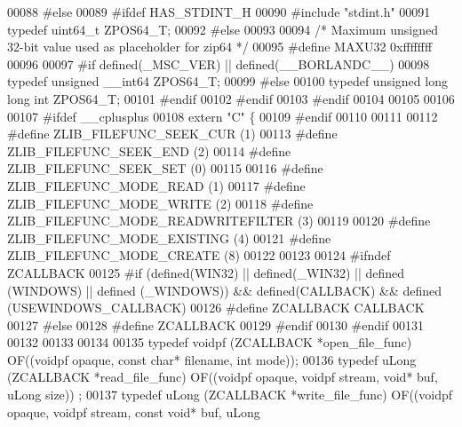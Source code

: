 \begin{DoxyCode}
00088 \textcolor{preprocessor}{#else}
00089 \textcolor{preprocessor}{#ifdef HAS\_STDINT\_H}
00090 \textcolor{preprocessor}{#include "stdint.h"}
00091 \textcolor{keyword}{typedef} uint64\_t ZPOS64\_T;
00092 \textcolor{preprocessor}{#else}
00093 
00094 \textcolor{comment}{/* Maximum unsigned 32-bit value used as placeholder for zip64 */}
00095 \textcolor{preprocessor}{#define MAXU32 0xffffffff}
00096 
00097 \textcolor{preprocessor}{#if defined(\_MSC\_VER) || defined(\_\_BORLANDC\_\_)}
00098 \textcolor{keyword}{typedef} \textcolor{keywordtype}{unsigned} \_\_int64 ZPOS64\_T;
00099 \textcolor{preprocessor}{#else}
00100 \textcolor{keyword}{typedef} \textcolor{keywordtype}{unsigned} \textcolor{keywordtype}{long} \textcolor{keywordtype}{long} \textcolor{keywordtype}{int} ZPOS64\_T;
00101 \textcolor{preprocessor}{#endif}
00102 \textcolor{preprocessor}{#endif}
00103 \textcolor{preprocessor}{#endif}
00104 
00105 
00106 
00107 \textcolor{preprocessor}{#ifdef \_\_cplusplus}
00108 \textcolor{keyword}{extern} \textcolor{stringliteral}{"C"} \{
00109 \textcolor{preprocessor}{#endif}
00110 
00111 
00112 \textcolor{preprocessor}{#define ZLIB\_FILEFUNC\_SEEK\_CUR (1)}
00113 \textcolor{preprocessor}{#define ZLIB\_FILEFUNC\_SEEK\_END (2)}
00114 \textcolor{preprocessor}{#define ZLIB\_FILEFUNC\_SEEK\_SET (0)}
00115 
00116 \textcolor{preprocessor}{#define ZLIB\_FILEFUNC\_MODE\_READ      (1)}
00117 \textcolor{preprocessor}{#define ZLIB\_FILEFUNC\_MODE\_WRITE     (2)}
00118 \textcolor{preprocessor}{#define ZLIB\_FILEFUNC\_MODE\_READWRITEFILTER (3)}
00119 
00120 \textcolor{preprocessor}{#define ZLIB\_FILEFUNC\_MODE\_EXISTING (4)}
00121 \textcolor{preprocessor}{#define ZLIB\_FILEFUNC\_MODE\_CREATE   (8)}
00122 
00123 
00124 \textcolor{preprocessor}{#ifndef ZCALLBACK}
00125 \textcolor{preprocessor}{ #if (defined(WIN32) || defined(\_WIN32) || defined (WINDOWS) || defined (\_WINDOWS)) && defined(CALLBACK) &&
       defined (USEWINDOWS\_CALLBACK)}
00126 \textcolor{preprocessor}{   #define ZCALLBACK CALLBACK}
00127 \textcolor{preprocessor}{ #else}
00128 \textcolor{preprocessor}{   #define ZCALLBACK}
00129 \textcolor{preprocessor}{ #endif}
00130 \textcolor{preprocessor}{#endif}
00131 
00132 
00133 
00134 
00135 \textcolor{keyword}{typedef} voidpf   (ZCALLBACK *open\_file\_func)      OF((voidpf opaque, \textcolor{keyword}{const} \textcolor{keywordtype}{char}* filename, \textcolor{keywordtype}{int} mode));
00136 \textcolor{keyword}{typedef} uLong    (ZCALLBACK *read\_file\_func)      OF((voidpf opaque, voidpf stream, \textcolor{keywordtype}{void}* buf, uLong size))
      ;
00137 \textcolor{keyword}{typedef} uLong    (ZCALLBACK *write\_file\_func)     OF((voidpf opaque, voidpf stream, \textcolor{keyword}{const} \textcolor{keywordtype}{void}* buf, uLong 

\end{DoxyCode}
